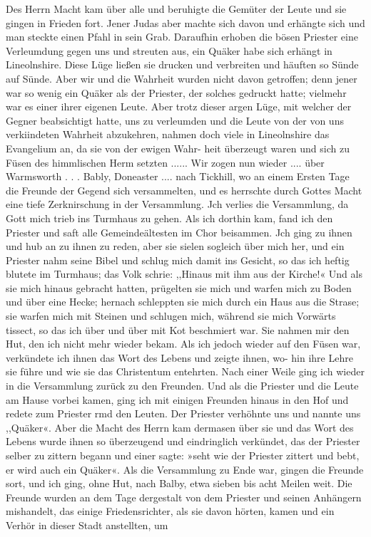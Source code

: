 Des Herrn Macht kam über alle und beruhigte die Gemüter der
Leute und sie gingen in Frieden fort. Jener Judas aber machte
sich davon und erhängte sich und man steckte einen Pfahl in sein
Grab. Daraufhin erhoben die bösen Priester eine Verleumdung
gegen uns und streuten aus, ein Quäker habe sich erhängt in
Lineolnshire. Diese Lüge ließen sie drucken und verbreiten und
häuften so Sünde auf Sünde. Aber wir und die Wahrheit wurden
nicht davon getroffen; denn jener war so wenig ein Quäker als
der Priester, der solches gedruckt hatte; vielmehr war es einer
ihrer eigenen Leute. Aber trotz dieser argen Lüge, mit welcher der
Gegner beabsichtigt hatte, uns zu verleumden und die Leute von
der von uns verkiindeten Wahrheit abzukehren, nahmen doch viele
in Lineolnshire das Evangelium an, da sie von der ewigen Wahr-
heit überzeugt waren und sich zu Füsen des himmlischen Herm
setzten ......
Wir zogen nun wieder .... über Warmsworth . . . Bably,
Doneaster .... nach Tickhill, wo an einem Ersten Tage die
Freunde der Gegend sich versammelten, und es herrschte durch
Gottes Macht eine tiefe Zerknirschung in der Versammlung.
Jch verlies die Versammlung, da Gott mich trieb ins Turmhaus
zu gehen. Als ich dorthin kam, fand ich den Priester und saft
alle Gemeindeältesten im Chor beisammen. Jch ging zu ihnen
und hub an zu ihnen zu reden, aber sie sielen sogleich über mich
her, und ein Priester nahm seine Bibel und schlug mich damit
ins Gesicht, so das ich heftig blutete im Turmhaus; das Volk
schrie: ,,Hinaus mit ihm aus der Kirche!« Und als sie mich hinaus
gebracht hatten, prügelten sie mich und warfen mich zu Boden
und über eine Hecke; hernach schleppten sie mich durch ein Haus
aus die Strase; sie warfen mich mit Steinen und schlugen mich,
während sie mich Vorwärts tissect, so das ich über und über mit
Kot beschmiert war. Sie nahmen mir den Hut, den ich nicht
mehr wieder bekam. Als ich jedoch wieder auf den Füsen war,
verkündete ich ihnen das Wort des Lebens und zeigte ihnen, wo-
hin ihre Lehre sie führe und wie sie das Christentum entehrten. Nach
einer Weile ging ich wieder in die Versammlung zurück zu den
Freunden. Und als die Priester und die Leute am Hause vorbei
kamen, ging ich mit einigen Freunden hinaus in den Hof und
redete zum Priester rmd den Leuten. Der Priester verhöhnte
uns und nannte uns ,,Quäker«. Aber die Macht des Herrn
kam dermasen über sie und das Wort des Lebens wurde ihnen
so überzeugend und eindringlich verkündet, das der Priester selber
zu zittern begann und einer sagte: »seht wie der Priester zittert
und bebt, er wird auch ein Quäker«. Als die Versammlung zu
Ende war, gingen die Freunde sort, und ich ging, ohne Hut,
nach Balby, etwa sieben bis acht Meilen weit. Die Freunde
wurden an dem Tage dergestalt von dem Priester und seinen
Anhängern mishandelt, das einige Friedensrichter, als sie davon
hörten, kamen und ein Verhör in dieser Stadt anstellten, um


